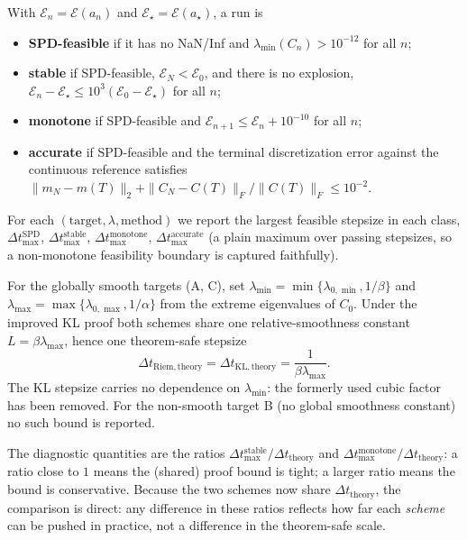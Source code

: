 \documentclass[11pt]{article}
\begin{document}
\begin{definition}\label{def:classes}
With $\mathcal{E}_n=\mathcal{E}(a_n)$ and $\mathcal{E}_\star=\mathcal{E}(a_\star)$, a run is
\begin{itemize}\itemsep2pt
  \item \textbf{SPD-feasible} if it has no NaN/Inf and $\lambda_{\min}(C_n)>10^{-12}$
  for all $n$;
  \item \textbf{stable} if SPD-feasible, $\mathcal{E}_N<\mathcal{E}_0$, and there is no explosion,
  $\mathcal{E}_n-\mathcal{E}_\star\le10^3(\mathcal{E}_0-\mathcal{E}_\star)$ for all $n$;
  \item \textbf{monotone} if SPD-feasible and $\mathcal{E}_{n+1}\le \mathcal{E}_n+10^{-10}$ for all $n$;
  \item \textbf{accurate} if SPD-feasible and the terminal discretization error
  against the continuous reference satisfies
  $\|m_N-m(T)\|_2+\|C_N-C(T)\|_F/\|C(T)\|_F\le10^{-2}$.
\end{itemize}
\end{definition}
For each $(\text{target},\lambda,\text{method})$ we report the largest feasible
stepsize in each class,
$\Delta t_{\max}^{\mathrm{SPD}}$, $\Delta t_{\max}^{\mathrm{stable}}$,
$\Delta t_{\max}^{\mathrm{monotone}}$, $\Delta t_{\max}^{\mathrm{accurate}}$
(a plain maximum over passing stepsizes, so a non-monotone feasibility boundary
is captured faithfully).

\begin{definition}\label{def:theory}
For the globally smooth targets (A, C), set
$\lambda_{\min}=\min\{\lambda_{0,\min},1/\beta\}$ and
$\lambda_{\max}=\max\{\lambda_{0,\max},1/\alpha\}$ from the extreme eigenvalues of
$C_0$. Under the improved KL proof both schemes share one relative-smoothness
constant $L=\beta\lambda_{\max}$, hence one theorem-safe stepsize
\begin{equation}
\Delta t_{\mathrm{Riem,theory}}=\Delta t_{\mathrm{KL,theory}}
=\frac1{\beta\lambda_{\max}} .
\end{equation}
The KL stepsize carries no dependence on $\lambda_{\min}$: the formerly used cubic
factor has been removed. For the non-smooth target B (no global smoothness
constant) no such bound is reported.
\end{definition}
The diagnostic quantities are the ratios
$\Delta t_{\max}^{\mathrm{stable}}/\Delta t_{\mathrm{theory}}$ and
$\Delta t_{\max}^{\mathrm{monotone}}/\Delta t_{\mathrm{theory}}$: a ratio close to
$1$ means the (shared) proof bound is tight; a larger ratio means the bound is
conservative. Because the two schemes now share $\Delta t_{\mathrm{theory}}$, the
comparison is direct: any difference in these ratios reflects how far each
\emph{scheme} can be pushed in practice, not a difference in the theorem-safe
scale.
\end{document}
